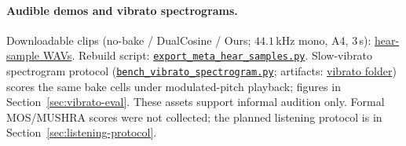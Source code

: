 
\paragraph{Audible demos and vibrato spectrograms.}
Downloadable clips (no-bake / DualCosine / Ours; $44.1$\,kHz mono, A4, $3$\,s):
\href{https://github.com/reeldemo/reelsynth/tree/main/brand/artifacts/meta_approach_compare/hear_samples}{hear-sample WAVs}.
Rebuild script:
\href{https://github.com/reeldemo/reelsynth/blob/main/scripts/export_meta_hear_samples.py}{\texttt{export\_meta\_hear\_samples.py}}.
Slow-vibrato spectrogram protocol
(\href{https://github.com/reeldemo/reelsynth/blob/main/scripts/bench_vibrato_spectrogram.py}{\texttt{bench\_vibrato\_spectrogram.py}};
artifacts:
\href{https://github.com/reeldemo/reelsynth/tree/main/brand/artifacts/vibrato_spectrogram}{vibrato folder})
scores the same bake cells under modulated-pitch playback; figures in Section~\ref{sec:vibrato-eval}.
These assets support informal audition only.
Formal MOS/MUSHRA scores were not collected; the planned listening protocol is in Section~\ref{sec:listening-protocol}.

